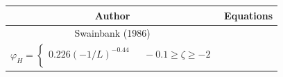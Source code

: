 {
\begin{table}[p]
\center
\centering
\vspace{-6em}
\small
    \begin{tabular}{| c | c |}
    \hline
        \textbf{Author} & \textbf{Equations} \\ \hline
        Swainbank (1986) \cite{foken:2008} & \shortstack{$\varphi_{m} = \begin{cases} 0.613(-\zeta)^{-0.2} & \text{    } -0.1 \geq \zeta \geq -2 \\ \end{cases}$ \\ $\varphi_{H} = \begin{cases} 0.226 (-1/L)^{-0.44} & \text{    } -0.1 \geq \zeta \geq -2 \\ \end{cases}$} \\ 
        

\end{tabular}
\end{table}}
